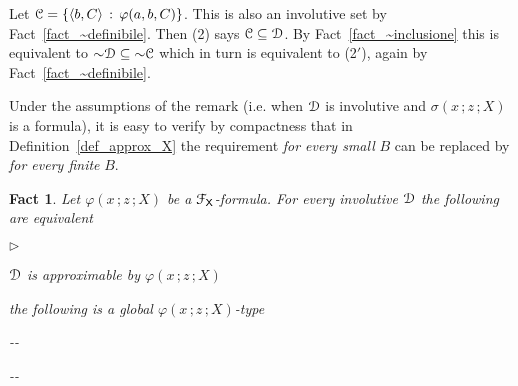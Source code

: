 \documentclass{amsproc}
\makeatletter
\newcommand{\mylabel}[1]{{#1}\hfill}
\renewenvironment{itemize}
  {\begin{list}{$\triangleright$}{%
  \setlength{\parskip}{0mm}
  \setlength{\topsep}{.1\baselineskip}
  \setlength{\rightmargin}{0mm}
  \setlength{\listparindent}{0mm}
  \setlength{\itemindent}{0mm}
  \setlength{\labelwidth}{3ex}
  \setlength{\itemsep}{.1\baselineskip}
  \setlength{\parsep}{.1\baselineskip}
  \setlength{\partopsep}{0mm}
  \setlength{\labelsep}{1ex}
  \setlength{\leftmargin}{\labelwidth+\labelsep}
  \let\makelabel\mylabel}}{%
\end{list}}
\newcounter{thm}
\theoremstyle{mio}
\newtheorem{fact}[thm]{Fact}\tcolorboxenvironment{fact}{mythm}
\providecommand{\proofNameStyle}{\bfseries}
\renewenvironment{proof}[1][\proofname]{\par
  \pushQED{\qed}%
  \normalfont%
  \trivlist
  \item[\hskip\labelsep
        \proofNameStyle
    #1\@addpunct{.}]\ignorespaces
}{%
  \popQED\endtrivlist\@endpefalse
}
\makeatother
\begin{document}
\begin{proof}
  Let ${\EuScript C}=\{\langle b,C\rangle\,:\,\varphi(a,b,C)\}$.
  This is also an involutive set by Fact~\ref{fact_~definibile}.
  Then (2) says ${\EuScript C}\subseteq{\EuScript D}$.
  By Fact~\ref{fact_~inclusione} this is equivalent to ${\sim}{\EuScript D}\subseteq{\sim}{\EuScript C}$ which in turn is equivalent to (2$'$), again by Fact~\ref{fact_~definibile}.
\end{proof}

Under the assumptions of the remark (i.e. when ${\EuScript D}$ is involutive and $\sigma(x\,;z\,;X)$ is a formula), it is easy to verify by compactness that in Definition~\ref{def_approx_X} the requirement \textit{for every small\/} $B$ can be replaced by \textit{for every finite\/} $B$.

\begin{fact}
  Let $\varphi(x\,;z\,;X)$ be a ${\EuScript F}_{\sf X}$-formula.
  For every involutive ${\EuScript D}$ the following are equivalent
  \begin{itemize}
    \item [1.] ${\EuScript D}$ is approximable by $\varphi(x\,;z\,;X)$
    \item [2.] the following is a global $\varphi(x\,;z\,;X)$-type\smallskip
    
    \noindent\kern-\kern-
    \smallskip

    \noindent\kern-\kern-
  
  \end{itemize}
\end{fact}
\end{document}
